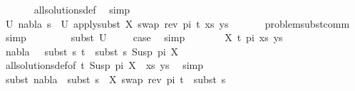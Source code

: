 \begin{isabellebody}
\ \ \ \ \ \isamarkupfalse%
\ all{\isacharunderscore}{\kern0pt}solutions{\isacharunderscore}{\kern0pt}def\ \isamarkupfalse%
\ simp\isanewline
\ \ \ \isamarkupfalse%
\ U{\isacharcolon}{\kern0pt}\ {\isachardoublequoteopen}{\isacharparenleft}{\kern0pt}nabla{}{\isacharcomma}{\kern0pt}\ s{}{\isacharparenright}{\kern0pt}\ {\isasymin}\ U\ {\isacharparenleft}{\kern0pt}apply{\isacharunderscore}{\kern0pt}subst\ {\isacharbrackleft}{\kern0pt}{\isacharparenleft}{\kern0pt}X{\isacharcomma}{\kern0pt}\ swap\ {\isacharparenleft}{\kern0pt}rev\ pi{\isacharparenright}{\kern0pt}\ t{\isacharprime}{\kern0pt}{\isacharparenright}{\kern0pt}{\isacharbrackright}{\kern0pt}\ {\isacharparenleft}{\kern0pt}xs{\isacharcomma}{\kern0pt}\ ys{\isacharparenright}{\kern0pt}{\isacharparenright}{\kern0pt}{\isachardoublequoteclose}\isanewline
\ \ \ \ \ \isamarkupfalse%
\ problem{\isacharunderscore}{\kern0pt}subst{\isacharunderscore}{\kern0pt}comm\ \isamarkupfalse%
\ simp\isanewline
\ \ \ \isanewline
\ \ \ \isamarkupfalse%
\ subst\ U\isanewline
\ \ \ \isamarkupfalse%
\ {\isacharquery}{\kern0pt}case\ \isamarkupfalse%
\ simp\isanewline
\ \isamarkupfalse%
\isanewline
\ \ \ \isamarkupfalse%
\ {\isacharparenleft}{\kern0pt}{}\ X\ t{\isacharprime}{\kern0pt}\ pi\ xs\ ys{\isacharparenright}{\kern0pt}\isanewline
\ \ \ \isamarkupfalse%
\ {\isachardoublequoteopen}nabla{}\ {\isasymturnstile}\ \ subst\ s{}\ t{\isacharprime}{\kern0pt}\ {\isasymapprox}\ subst\ s{}\ {\isacharparenleft}{\kern0pt}Susp\ pi\ X{\isacharparenright}{\kern0pt}{\isachardoublequoteclose}\isanewline
\ \ \ \ \ \isamarkupfalse%
\ all{\isacharunderscore}{\kern0pt}solutions{\isacharunderscore}{\kern0pt}def{\isacharbrackleft}{\kern0pt}of\ {\isacartoucheopen}{\isacharparenleft}{\kern0pt}{\isacharparenleft}{\kern0pt}t{\isacharprime}{\kern0pt}{\isacharcomma}{\kern0pt}\ Susp\ pi\ X{\isacharparenright}{\kern0pt}\ {\isacharhash}{\kern0pt}\ xs{\isacharcomma}{\kern0pt}\ ys{\isacharparenright}{\kern0pt}{\isacartoucheclose}{\isacharbrackright}{\kern0pt}\ \isamarkupfalse%
\ simp\isanewline
\ \ \ \isamarkupfalse%
\ subst{\isacharcolon}{\kern0pt}\ {\isachardoublequoteopen}nabla{}\ {\isasymTurnstile}\ subst\ {\isacharparenleft}{\kern0pt}s{}\ {\isasymbullet}\ {\isacharbrackleft}{\kern0pt}{\isacharparenleft}{\kern0pt}X{\isacharcomma}{\kern0pt}\ swap\ {\isacharparenleft}{\kern0pt}rev\ pi{\isacharparenright}{\kern0pt}\ t{\isacharprime}{\kern0pt}{\isacharparenright}{\kern0pt}{\isacharbrackright}{\kern0pt}{\isacharparenright}{\kern0pt}\ {\isasymapprox}\ subst\ s{}\ {\isachardoublequoteclose}\isanewline

\end{isabellebody}
